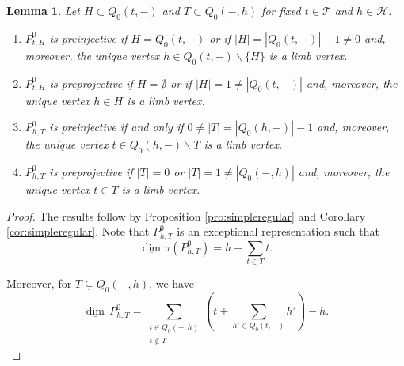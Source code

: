 \documentclass{amsart}
\newtheorem{lemma}[theorem]{Lemma}
\numberwithin{equation}{section}
\newcommand{\cH}{\mathcal{H}}
\newcommand{\cT}{\mathcal{T}}
\newcommand\udim{{\underline{\dim}\, }}
\begin{document}
\begin{lemma}\label{lem:truncated3}Let $H\subset Q_0(t,-)$ and $T\subset Q_0(-,h)$ for fixed $t\in\cT$ and $h\in\cH $.
\begin{enumerate} 
\item $P_{t,H}^0$ is preinjective if $H=Q_0(t,-)$ or if $|H|=|Q_0(t,-)|-1\neq 0$ and, moreover, the unique vertex $h\in Q_0(t,-)\backslash\{H\}$ is a limb vertex.
\item $P_{t,H}^0$ is preprojective if $H=\emptyset$ or if $|H|=1\neq |Q_0(t,-)| $ and, moreover, the unique vertex $h\in H$ is a limb vertex.
\item  $P_{h,T}^0$ is preinjective if and only if $0\neq |T|=|Q_0(h,-)|-1$ and, moreover, the unique vertex $t\in Q_0(h,-)\backslash T$ is a limb vertex.
\item $P_{h,T}^0$ is preprojective if $|T|=0$ or $|T|=1\neq |Q_0(-,h)|$ and, moreover, the unique vertex $t\in T$ is a limb vertex.
\end{enumerate}

\end{lemma}
\begin{proof}
The results follow by Proposition \ref{pro:simpleregular} and Corollary \ref{cor:simpleregular}. Note that $P_{h,T}^0$ is an exceptional representation such that
$$\udim\tau\left(P_{h,T}^0\right)=h+\sum_{t\in T}t.$$

Moreover, for $T\subsetneq Q_0(-,h)$, we have 
$$\udim P_{h,T}^0=\sum_{\substack{t\in Q_0(-,h)\\t\notin T}}\left(t+\sum_{h'\in Q_0(t,-)}h'\right)-h.$$






\end{proof}
\end{document}
